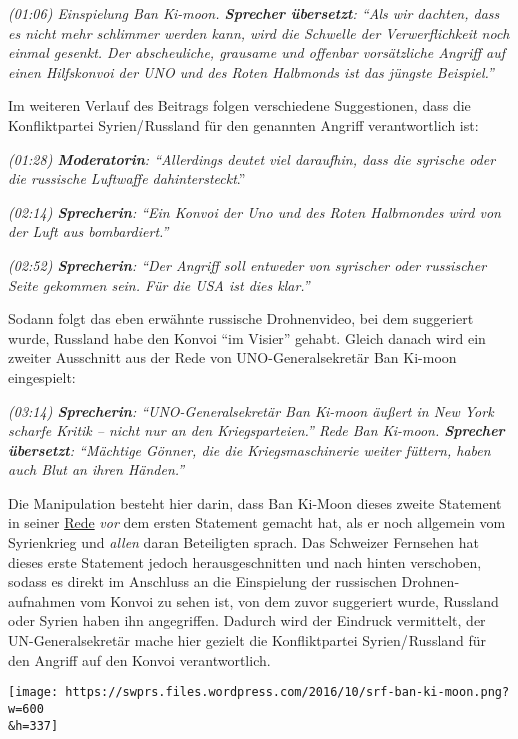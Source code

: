 \emph{(01:06) Einspielung Ban Ki-moon. \textbf{Sprecher übersetzt}:
``Als wir dachten, dass es nicht mehr schlimmer werden kann, wird die
Schwelle der Verwerflichkeit noch einmal gesenkt. Der abscheuliche,
grausame und offenbar vorsätzliche Angriff auf einen Hilfskonvoi der UNO
und des Roten Halbmonds ist das jüngste Beispiel.''}

Im weiteren Verlauf des Beitrags folgen verschiedene Suggestionen, dass
die Konfliktpartei Syrien/ Russland für den genannten Angriff
verantwortlich ist:

\emph{(01:28) \textbf{Moderatorin}: ``Allerdings deutet viel daraufhin,
dass die syrische oder die russische Luftwaffe dahintersteckt}.''

\emph{(02:14) \textbf{Sprecherin}: ``Ein Konvoi der Uno und des Roten
Halbmondes wird von der Luft aus bombardiert.''}

\emph{(02:52) \textbf{Sprecherin}: ``Der Angriff soll entweder von
syrischer oder russischer Seite gekommen sein. Für die USA ist dies
klar.''}

Sodann folgt das eben erwähnte russische Drohnenvideo, bei dem
suggeriert wurde, Russland habe den Konvoi ``im Visier'' gehabt. Gleich
danach wird ein zweiter Ausschnitt aus der Rede von UNO-Generalsekretär
Ban Ki-moon eingespielt:

\emph{(03:14) \textbf{Sprecherin}: ``UNO-Generalsekretär Ban Ki-moon
äußert in New York scharfe Kritik -- nicht nur an den Kriegsparteien.''
Rede Ban Ki-moon. \textbf{Sprecher übersetzt}: ``Mächtige Gönner, die
die Kriegsmaschinerie weiter füttern, haben auch Blut an ihren
Händen.''}

Die Manipulation besteht hier darin, dass Ban Ki-Moon dieses zweite
Statement in seiner
\href{https://gadebate.un.org/en/71/secretary-general-united-nations}{Rede}
\emph{vor} dem ersten Statement gemacht hat, als er noch allgemein vom
Syrienkrieg und \emph{allen} daran Beteiligten sprach. Das Schweizer
Fernsehen hat dieses erste Statement jedoch heraus­geschnitten und nach
hinten verschoben, sodass es direkt im Anschluss an die Einspielung der
russischen Drohnen­aufnahmen vom Konvoi zu sehen ist, von dem zuvor
suggeriert wurde, Russland oder Syrien haben ihn angegriffen. Dadurch
wird der Eindruck vermittelt, der UN-General­sekretär mache hier gezielt
die Konfliktpartei Syrien/ Russland für den Angriff auf den Konvoi
verantwortlich.

\texttt{[image: https://swprs.files.wordpress.com/2016/10/srf-ban-ki-moon.png?w=600\\\&h=337]}

